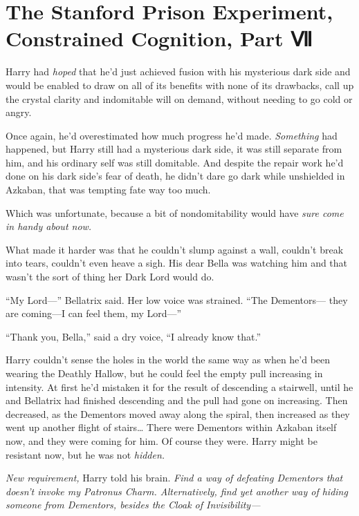 \chapter{The Stanford Prison Experiment, Constrained Cognition, Part
Ⅶ}\label{the-stanford-prison-experiment-constrained-cognition-part}

Harry had \emph{hoped} that he'd just achieved fusion with his
mysterious dark side and would be enabled to draw on all of its benefits
with none of its drawbacks, call up the crystal clarity and indomitable
will on demand, without needing to go cold or angry.

Once again, he'd overestimated how much progress he'd made.
\emph{Something} had happened, but Harry still had a mysterious dark
side, it was still separate from him, and his ordinary self was still
domitable. And despite the repair work he'd done on his dark side's fear
of death, he didn't dare go dark while unshielded in Azkaban, that was
tempting fate way too much.

Which was unfortunate, because a bit of nondomitability would have
\emph{sure come in handy about now.}

What made it harder was that he couldn't slump against a wall, couldn't
break into tears, couldn't even heave a sigh. His dear Bella was
watching him and that wasn't the sort of thing her Dark Lord would do.

``My Lord---'' Bellatrix said. Her low voice was strained. ``The
Dementors--- they are coming---I can feel them, my Lord---''

``Thank you, Bella,'' said a dry voice, ``I already know that.''

Harry couldn't sense the holes in the world the same way as when he'd
been wearing the Deathly Hallow, but he could feel the empty pull
increasing in intensity. At first he'd mistaken it for the result of
descending a stairwell, until he and Bellatrix had finished descending
and the pull had gone on increasing. Then decreased, as the Dementors
moved away along the spiral, then increased as they went up another
flight of stairs\ldots{} There were Dementors within Azkaban itself now,
and they were coming for him. Of course they were. Harry might be
resistant now, but he was not \emph{hidden.}

\emph{New requirement,} Harry told his brain. \emph{Find a way of
defeating Dementors that doesn't invoke my Patronus Charm.
Alternatively, find yet another way of hiding someone from Dementors,
besides the Cloak of Invisibility---}

